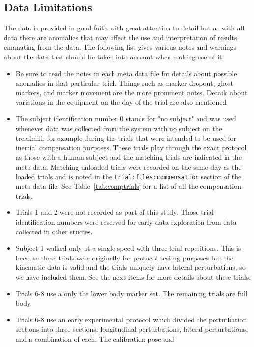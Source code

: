 \documentclass[fleqn,12pt]{wlpeerj}
\begin{document}
\subsection*{Data Limitations}
%
The data is provided in good faith with great attention to detail but as with
all data there are anomalies that may affect the use and interpretation of
results emanating from the data. The following list gives various notes and
warnings about the data that should be taken into account when making use of
it.
%
\begin{itemize}
  \item Be sure to read the notes in each meta data file for details about
    possible anomalies in that particular trial. Things such as marker dropout,
    ghost markers, and marker movement are the more prominent notes. Details
    about variations in the equipment on the day of the trial are also
    mentioned.
  \item The subject identification number 0 stands for "no subject" and was
    used whenever data was collected from the system with no subject on the
    treadmill, for example during the trials that were intended to be used for
    inertial compensation purposes. These trials play through the exact
    protocol as those with a human subject and the matching trials are
    indicated in the meta data. Matching unloaded trials were recorded on the
    same day as the loaded trials and is noted in the
    \verb|trial:files:compensation| section of the meta data file. See
    Table~\ref{tab:comptrials} for a list of all the compensation trials.
  \item Trials 1 and 2 were not recorded as part of this study. Those trial
    identification numbers were reserved for early data exploration from data
    collected in other studies.
  \item Subject 1 walked only at a single speed with three trial repetitions.
    This is because these trials were originally for protocol testing purposes
    but the kinematic data is valid and the trials uniquely have lateral
    perturbations, so we have included them. See the next items for more
    details about these trials.
  \item Trials 6-8 use a only the lower body marker set. The remaining trials
    are full body.
  \item Trials 6-8 use an early experimental protocol which divided the
    perturbation sections into three sections: longitudinal perturbations,
    lateral perturbations, and a combination of each. The calibration pose and

\end{itemize}
\end{document}
